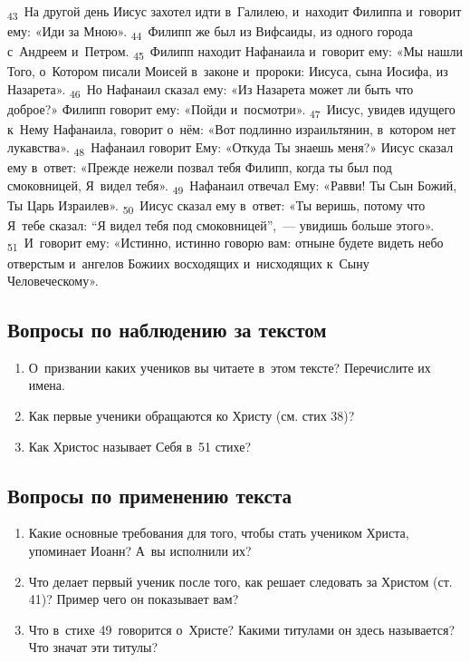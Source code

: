 \documentclass[a4paper,12pt]{article}
\begin{document}
\textsubscript{43}~На другой день Иисус захотел идти в~Галилею, и~находит Филиппа и~говорит ему: «Иди за Мною».
\textsubscript{44}~Филипп же был из Вифсаиды, из одного города с~Андреем и~Петром.
\textsubscript{45}~Филипп находит Нафанаила и~говорит ему: «Мы нашли Того, о~Котором писали Моисей в~законе и~пророки: Иисуса, сына Иосифа, из Назарета».
\textsubscript{46}~Но Нафанаил сказал ему: «Из Назарета может ли быть что доброе?» Филипп говорит ему: «Пойди и~посмотри».
\textsubscript{47}~Иисус, увидев идущего к~Нему Нафанаила, говорит о~нём: «Вот подлинно израильтянин, в~котором нет лукавства».
\textsubscript{48}~Нафанаил говорит Ему: «Откуда Ты знаешь меня?» Иисус сказал ему в~ответ: «Прежде нежели позвал тебя Филипп, когда ты был под смоковницей, Я~видел тебя».
\textsubscript{49}~Нафанаил отвечал Ему: «Равви! Ты Сын Божий, Ты Царь Израилев».
\textsubscript{50}~Иисус сказал ему в~ответ: «Ты веришь, потому что Я~тебе сказал: “Я видел тебя под смоковницей”,~--- увидишь больше этого».
\textsubscript{51}~И~говорит ему: «Истинно, истинно говорю вам: отныне будете видеть небо отверстым и~ангелов Божиих восходящих и~нисходящих к~Сыну Человеческому». 

\subsection*{Вопросы по наблюдению за текстом}
\begin{enumerate}
    \item О~призвании каких учеников вы читаете в~этом тексте? Перечислите их имена. 
    
    \myline
    
    \myline
    \item Как первые ученики обращаются ко Христу (см. стих 38)? 
    
    \myline
    
    \myline
    \item Как Христос называет Себя в~51 стихе?
    
    \myline
    
    \myline
\end{enumerate}

\subsection*{Вопросы по применению текста} 
\begin{enumerate}
    \item Какие основные требования для того, чтобы стать учеником Христа, упоминает Иоанн? А~вы исполнили их? 
    
    \myline
    
    \myline
    \item Что делает первый ученик после того, как решает следовать за Христом (ст. 41)? Пример чего он показывает вам? 
    
    \myline
    
    \myline
    \item Что в~стихе 49~говорится о~Христе? Какими титулами он здесь называется? Что значат эти титулы? 
    
    \myline
    
    \myline
\end{enumerate}
\end{document}
